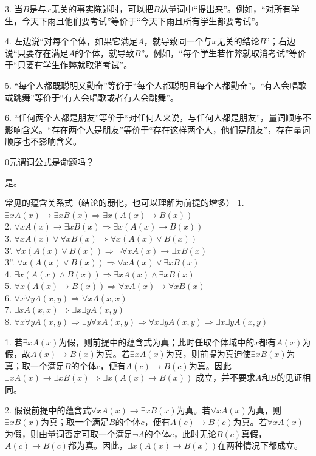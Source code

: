 \documentclass[lang=cn,11pt]{elegantbook}
\begin{document}
3. 当$B$是与$x$无关的事实陈述时，可以把$B$从量词中“提出来”。例如，“对所有学生，今天下雨且他们要考试”等价于“今天下雨且所有学生都要考试”。

4. 左边说“对每个个体，如果它满足$A$，就导致同一个与$x$无关的结论$B$”；右边说“只要存在满足$A$的个体，就导致$B$”。例如，“每个学生若作弊就取消考试”等价于“只要有学生作弊就取消考试”。

5. “每个人都既聪明又勤奋”等价于“每个人都聪明且每个人都勤奋”。“有人会唱歌或跳舞”等价于“有人会唱歌或者有人会跳舞”。

6. “任何两个人都是朋友”等价于“对任何人来说，与任何人都是朋友”，量词顺序不影响含义。“存在两个人是朋友”等价于“存在这样两个人，他们是朋友”，存在量词顺序也不影响含义。
\begin{example}
    0元谓词公式是命题吗？
\end{example}
是。
\begin{theorem}{常见的蕴含关系式（结论的弱化，也可以理解为前提的增多）}
1. $\exists xA(x)\to\exists xB(x)\Rightarrow\exists x(A(x)\to B(x))$\\
2. $\forall xA(x)\to \exists xB(x)\Rightarrow \exists x(A(x)\to B(x))$\\
3. $\forall xA(x)\lor \forall xB(x)\Rightarrow \forall x(A(x)\lor B(x))$\\
3'. $\forall x(A(x)\lor B(x))\Rightarrow \neg\forall xA(x)\to\exists xB(x)$\\
3''. $\forall x(A(x)\lor B(x))\Rightarrow \forall xA(x)\lor \exists xB(x)$\\
4. $\exists x(A(x)\land B(x))\Rightarrow \exists xA(x)\land \exists xB(x)$\\
5. $\forall x(A(x)\to B(x))\Rightarrow \forall xA(x)\to \forall xB(x)$\\
6. $\forall x\forall yA(x,y)\Rightarrow \forall xA(x,x)$\\
7. $\exists xA(x,x)\Rightarrow \exists x\exists yA(x,y)$\\
8. $\forall x\forall yA(x,y)\Rightarrow \exists y\forall xA(x,y)\Rightarrow \forall x\exists yA(x,y)\Rightarrow \exists x\exists yA(x,y)$
\end{theorem}
1. 若$\exists xA(x)$为假，则前提中的蕴含式为真；此时任取个体域中的$x$都有$A(x)$为假，故$A(x)\to B(x)$为真。若$\exists xA(x)$为真，则前提为真迫使$\exists xB(x)$为真；取一个满足$B$的个体$c$，便有$A(c)\to B(c)$为真。因此 $\exists xA(x)\to\exists xB(x)\Rightarrow\exists x(A(x)\to B(x))$ 成立，并不要求$A$和$B$的见证相同。

2. 假设前提中的蕴含式$\forall xA(x)\to\exists xB(x)$为真。若$\forall xA(x)$为真，则$\exists xB(x)$为真；取一个满足$B$的个体$c$，便有$A(c)\to B(c)$为真。若$\forall xA(x)$为假，则由量词否定可取一个满足$\neg A$的个体$c$，此时无论$B(c)$真假，$A(c)\to B(c)$都为真。因此，$\exists x(A(x)\to B(x))$在两种情况下都成立。
\end{document}
